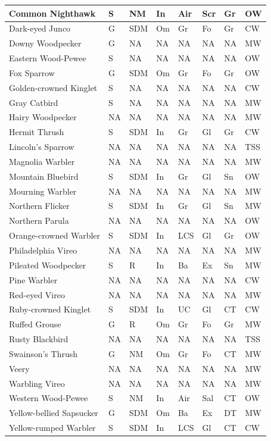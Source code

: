 \documentclass[
  letterpaper,
  DIV=11,
  numbers=noendperiod,
  oneside]{scrartcl}
\begin{document}
\begin{table}
\begin{tabular}{l|l|l|l|l|l|l|l}
\hline
Common Nighthawk & S & NM & In & Air & Scr & Gr & OW\\
\hline
Dark-eyed Junco & G & SDM & Om & Gr & Fo & Gr & CW\\
\hline
Downy Woodpecker & G & NA & NA & NA & NA & NA & MW\\
\hline
Eastern Wood-Pewee & S & NA & NA & NA & NA & NA & OW\\
\hline
Fox Sparrow & G & SDM & Om & Gr & Fo & Gr & OW\\
\hline
Golden-crowned Kinglet & S & NA & NA & NA & NA & NA & CW\\
\hline
Gray Catbird & S & NA & NA & NA & NA & NA & MW\\
\hline
Hairy Woodpecker & NA & NA & NA & NA & NA & NA & MW\\
\hline
Hermit Thrush & S & SDM & In & Gr & Gl & Gr & CW\\
\hline
Lincoln's Sparrow & NA & NA & NA & NA & NA & NA & TSS\\
\hline
Magnolia Warbler & NA & NA & NA & NA & NA & NA & MW\\
\hline
Mountain Bluebird & S & SDM & In & Gr & Gl & Sn & OW\\
\hline
Mourning Warbler & NA & NA & NA & NA & NA & NA & MW\\
\hline
Northern Flicker & S & SDM & In & Gr & Gl & Sn & MW\\
\hline
Northern Parula & NA & NA & NA & NA & NA & NA & OW\\
\hline
Orange-crowned Warbler & S & SDM & In & LCS & Gl & Gr & OW\\
\hline
Philadelphia Vireo & NA & NA & NA & NA & NA & NA & MW\\
\hline
Pileated Woodpecker & S & R & In & Ba & Ex & Sn & MW\\
\hline
Pine Warbler & NA & NA & NA & NA & NA & NA & CW\\
\hline
Red-eyed Vireo & NA & NA & NA & NA & NA & NA & MW\\
\hline
Ruby-crowned Kinglet & S & SDM & In & UC & Gl & CT & CW\\
\hline
Ruffed Grouse & G & R & Om & Gr & Fo & Gr & MW\\
\hline
Rusty Blackbird & NA & NA & NA & NA & NA & NA & TSS\\
\hline
Swainson's Thrush & G & NM & Om & Gr & Fo & CT & MW\\
\hline
Veery & NA & NA & NA & NA & NA & NA & MW\\
\hline
Warbling Vireo & NA & NA & NA & NA & NA & NA & MW\\
\hline
Western Wood-Pewee & S & NM & In & Air & Sal & CT & OW\\
\hline
Yellow-bellied Sapsucker & G & SDM & Om & Ba & Ex & DT & MW\\
\hline
Yellow-rumped Warbler & S & SDM & In & LCS & Gl & CT & CW\\
\hline
\end{tabular}
\end{table}
\end{document}
